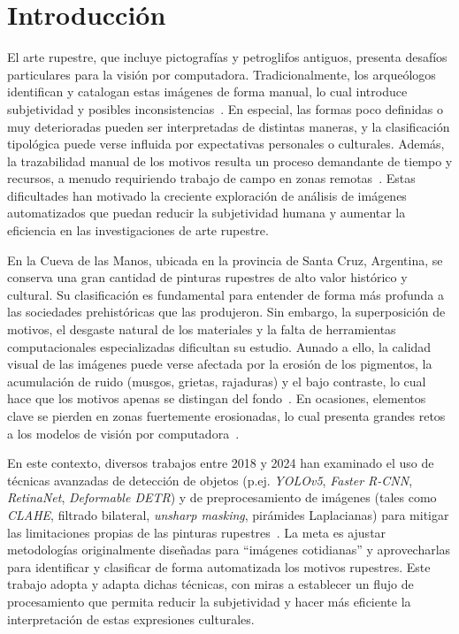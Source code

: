 \chapter{Introducción}

El arte rupestre, que incluye pictografías y petroglifos antiguos, presenta desafíos particulares para la visión por computadora. Tradicionalmente, los arqueólogos identifican y catalogan estas imágenes de forma manual, lo cual introduce subjetividad y posibles inconsistencias~\cite{horn2022,suhaimi2023}. En especial, las formas poco definidas o muy deterioradas pueden ser interpretadas de distintas maneras, y la clasificación tipológica puede verse influida por expectativas personales o culturales. Además, la trazabilidad manual de los motivos resulta un proceso demandante de tiempo y recursos, a menudo requiriendo trabajo de campo en zonas remotas~\cite{horn2022,suhaimi2023}. Estas dificultades han motivado la creciente exploración de análisis de imágenes automatizados que puedan reducir la subjetividad humana y aumentar la eficiencia en las investigaciones de arte rupestre.

En la Cueva de las Manos, ubicada en la provincia de Santa Cruz, Argentina, se conserva una gran cantidad de pinturas rupestres de alto valor histórico y cultural. Su clasificación es fundamental para entender de forma más profunda a las sociedades prehistóricas que las produjeron. Sin embargo, la superposición de motivos, el desgaste natural de los materiales y la falta de herramientas computacionales especializadas dificultan su estudio. Aunado a ello, la calidad visual de las imágenes puede verse afectada por la erosión de los pigmentos, la acumulación de ruido (musgos, grietas, rajaduras) y el bajo contraste, lo cual hace que los motivos apenas se distingan del fondo~\cite{jalandoni2022,suhaimi2023}. En ocasiones, elementos clave se pierden en zonas fuertemente erosionadas, lo cual presenta grandes retos a los modelos de visión por computadora~\cite{horn2022}.

En este contexto, diversos trabajos entre 2018 y 2024 han examinado el uso de técnicas avanzadas de detección de objetos (p.ej. \textit{YOLOv5}, \textit{Faster R-CNN}, \textit{RetinaNet}, \textit{Deformable DETR}) y de preprocesamiento de imágenes (tales como \textit{CLAHE}, filtrado bilateral, \textit{unsharp masking}, pirámides Laplacianas) para mitigar las limitaciones propias de las pinturas rupestres~\cite{horn2022,alvarez2021,suhaimi2023}. La meta es ajustar metodologías originalmente diseñadas para “imágenes cotidianas” y aprovecharlas para identificar y clasificar de forma automatizada los motivos rupestres. Este trabajo adopta y adapta dichas técnicas, con miras a establecer un flujo de procesamiento que permita reducir la subjetividad y hacer más eficiente la interpretación de estas expresiones culturales.

